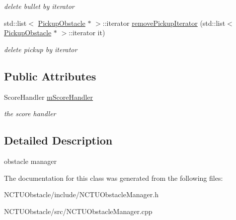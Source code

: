 \begin{DoxyCompactItemize}
\begin{DoxyCompactList}\small\item\em delete bullet by iterator \end{DoxyCompactList}\item 
std\+::list$<$ \hyperlink{class_n_c_t_u_1_1_pickup_obstacle}{Pickup\+Obstacle} $\ast$ $>$\+::iterator \hyperlink{class_n_c_t_u_1_1_obstacle_manager_a7c35359f1c719429a88350db867ce72e}{remove\+Pickup\+Iterator} (std\+::list$<$ \hyperlink{class_n_c_t_u_1_1_pickup_obstacle}{Pickup\+Obstacle} $\ast$ $>$\+::iterator it)\hypertarget{class_n_c_t_u_1_1_obstacle_manager_a7c35359f1c719429a88350db867ce72e}{}\label{class_n_c_t_u_1_1_obstacle_manager_a7c35359f1c719429a88350db867ce72e}

\begin{DoxyCompactList}\small\item\em delete pickup by iterator \end{DoxyCompactList}\end{DoxyCompactItemize}
\subsection*{Public Attributes}
\begin{DoxyCompactItemize}
\item 
Score\+Handler \hyperlink{class_n_c_t_u_1_1_obstacle_manager_ae1e85963f99511e675c81261681131e4}{m\+Score\+Handler}\hypertarget{class_n_c_t_u_1_1_obstacle_manager_ae1e85963f99511e675c81261681131e4}{}\label{class_n_c_t_u_1_1_obstacle_manager_ae1e85963f99511e675c81261681131e4}

\begin{DoxyCompactList}\small\item\em the score handler \end{DoxyCompactList}\end{DoxyCompactItemize}


\subsection{Detailed Description}
obstacle manager 

The documentation for this class was generated from the following files\+:\begin{DoxyCompactItemize}
\item 
N\+C\+T\+U\+Obstacle/include/N\+C\+T\+U\+Obstacle\+Manager.\+h\item 
N\+C\+T\+U\+Obstacle/src/N\+C\+T\+U\+Obstacle\+Manager.\+cpp\end{DoxyCompactItemize}
